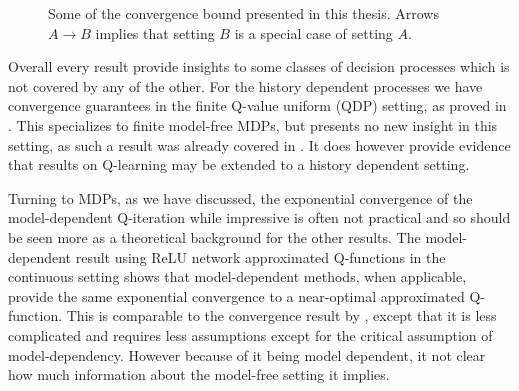 \begin{figure}[H]
\caption{Some of the convergence bound presented in this thesis.
Arrows $A \to B$ implies that setting $B$ is a special
case of setting $A$.}
\end{figure}

Overall every result provide insights to some classes of decision processes
which is not covered by any of the other.
For the history dependent processes we have convergence guarantees
in the finite Q-value uniform (QDP) setting, as proved in
. This specializes to finite model-free MDPs, but presents no
new insight in this setting, as such a result was already covered
in . It does however provide evidence that results on Q-learning
may be extended to a history dependent setting.

Turning to MDPs,
as we have discussed, the exponential convergence of the model-dependent
Q-iteration while impressive is often not practical and so should be
seen more as a theoretical background for the other results.
The model-dependent result using ReLU network approximated Q-functions
in the continuous setting
shows that model-dependent methods, when applicable, provide the same
exponential convergence to a near-optimal approximated Q-function.
This is comparable to the convergence result by , except that it is
less complicated and requires less assumptions except for the critical
assumption of model-dependency.
However because of it being model dependent, it not clear how much
information about the model-free setting it implies.


